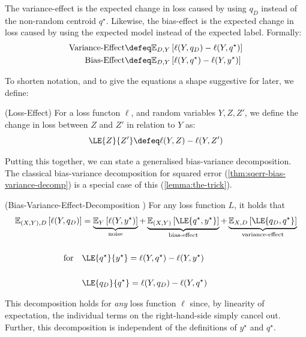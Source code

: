 \documentclass[
    a4paper, %
	fontsize=10pt, %
	twoside=false, %
]{kaobook}
\begin{document}
The variance-effect is the expected change in loss caused by using $q_{D}$ instead of the non-random centroid $q^\star$. Likewise, the bias-effect is the expected change in loss caused by using the expected model instead of the expected label. 
Formally:
\begin{align*}
\text{Variance-Effect} &\defeq \mathbb{E}_{D,Y}\left[ \ell(Y, q_{D}) - \ell(Y, q^\star) \right] \\
\text{Bias-Effect} &\defeq \mathbb{E}_{D,Y}\left[ \ell(Y, q^\star) - \ell(Y, y^\star) \right] 
\end{align*}

To shorten notation, and to give the equations a shape suggestive for later, we define:
\begin{definition} (Loss-Effect) For a loss functon $\ell$, and random variables $Y, Z, Z'$, we define the change in loss between $Z$ and $Z'$ in relation to $Y$ as:
  $$
  \LE{Z}{Z'} \defeq \ell(Y, Z) - \ell(Y, Z')
  $$
  \label{def:loss-effect}
\end{definition}

Putting this together, we can state a generalised bias-variance decomposition. The classical bias-variance decomposition for squared error (\ref{thm:sqerr-bias-variance-decomp}) is a special case of this (\ref{lemma:the-trick}).

\begin{theorem} (Bias-Variance-Effect-Decomposition \cite{james_GeneralizationsBiasVariance_})
\label{thm:bias-variance-effect}
For any loss function $L$, it holds that
\begin{align*}
\mathbb{E}_{(X,Y), D}\left[ \ell(Y, q_{D}) \right]  
&= 
\underbrace{\mathbb{E}_{Y}\left[ \ell(Y, y^\star) \right]  }_{\text{noise}}
+ \underbrace{\mathbb{E}_{(X,Y)}\left[ \LE{q^\star, y^\star} \right] }_{\text{bias-effect}}
+ \underbrace{\mathbb{E}_{X,D}\left[ \LE{q_D, q^\star} \right] }_{\text{variance-effect}}  \\
\\ 
\text{for} \hspace{1em}
& \LE{q^\star}{y^\star} = \ell(Y, q^\star) - \ell(Y, y^\star) \\ \\
&\LE{q_{D}}{q^\star} = \ell(Y, q_{D}) - \ell(Y, q^\star)
\end{align*}
\end{theorem}
This decomposition holds for \textit{any} loss function $\ell$ since, by linearity of expectation, the individual terms on the right-hand-side simply cancel out. Further, this decomposition is independent of the definitions of $y^\star$ and $q^\star$.
\end{document}
